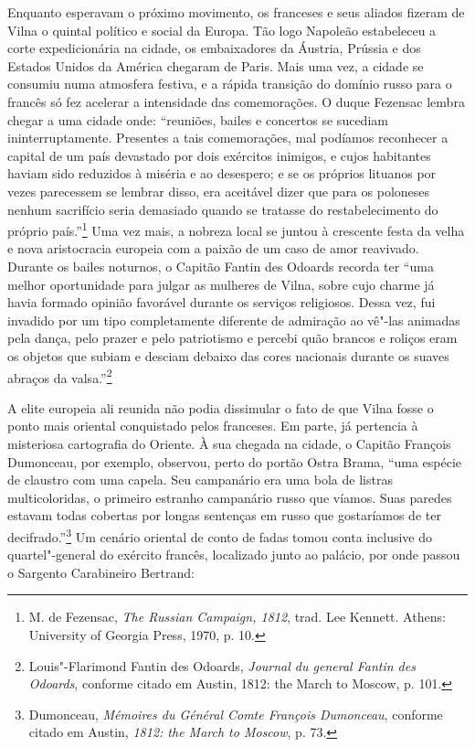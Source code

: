 Enquanto esperavam o próximo movimento, os franceses e seus aliados
fizeram de Vilna o quintal político e social da Europa. Tão logo
Napoleão estabeleceu a corte expedicionária na cidade, os embaixadores
da Áustria, Prússia e dos Estados Unidos da América chegaram de Paris.
Mais uma vez, a cidade se consumiu numa atmosfera festiva, e a rápida
transição do domínio russo para o francês só fez acelerar a intensidade
das comemorações. O duque Fezensac lembra chegar a uma cidade onde:
``reuniões, bailes e concertos se sucediam ininterruptamente. Presentes
a tais comemorações, mal podíamos reconhecer a capital de um país
devastado por dois exércitos inimigos, e cujos habitantes haviam sido
reduzidos à miséria e ao desespero; e se os próprios lituanos por vezes
parecessem se lembrar disso, era aceitável dizer que para os poloneses
nenhum sacrifício seria demasiado quando se tratasse do restabelecimento
do próprio país.''\footnote{M. de Fezensac, \textit{The Russian Campaign, 1812}, trad. Lee Kennett. Athens: University of Georgia Press, 1970, p. 10.} Uma vez mais, a nobreza local se juntou à crescente festa da velha e nova aristocracia europeia com a paixão de um caso de amor
reavivado. Durante os bailes noturnos, o Capitão Fantin des Odoards
recorda ter ``uma melhor oportunidade para julgar as mulheres de Vilna,
sobre cujo charme já havia formado opinião favorável durante os serviços
religiosos. Dessa vez, fui invadido por um tipo completamente diferente
de admiração ao vê"-las animadas pela dança, pelo prazer e pelo
patriotismo e percebi quão brancos e roliços eram os objetos que subiam
e desciam debaixo das cores nacionais durante os suaves abraços da
valsa.''\footnote{Louis"-Flarimond Fantin des Odoards, \textit{Journal du general Fantin des Odoards}, conforme citado em Austin, 1812: the March to Moscow, p. 101.}

A elite europeia ali reunida não podia dissimular o fato de que Vilna
fosse o ponto mais oriental conquistado pelos franceses. Em parte, já
pertencia à misteriosa cartografia do Oriente. À sua chegada na cidade,
o Capitão François Dumonceau, por exemplo, observou, perto do portão
Ostra Brama, ``uma espécie de claustro com uma capela. Seu campanário
era uma bola de listras multicoloridas, o primeiro estranho campanário
russo que víamos. Suas paredes estavam todas cobertas por longas
sentenças em russo que gostaríamos de ter decifrado.''\footnote{Dumonceau, \textit{Mémoires du Général Comte François Dumonceau}, conforme citado em Austin, \textit{1812: the March to Moscow}, p. 73.} Um cenário oriental de conto de fadas tomou conta inclusive do quartel"-general do
exército francês, localizado junto ao palácio, por onde passou o
Sargento Carabineiro Bertrand:

